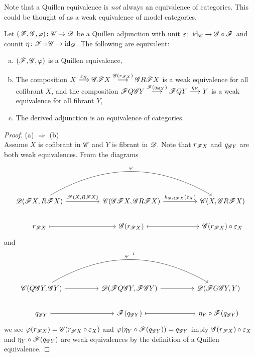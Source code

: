 \documentclass[10pt]{amsart}
\begin{document}
\begin{rmk}
  Note that a Quillen equivalence is {\it not} always an equivalence of categories.
  This could be thought of as a weak equivalence of model categories.
\end{rmk}

\begin{prop}
  Let $(\mathscr{F}, \mathscr{G}, \varphi) \colon \mathscr{C} \to \mathscr{D}$ be a Quillen adjunction with unit $\varepsilon \colon \operatorname{id}_{\mathscr{C}} \to \mathscr{G} \circ \mathscr{F}$ and counit $\eta \colon \mathscr{F} \circ \mathscr{G} \to \operatorname{id}_{\mathscr{D}}$.
  The following are equivalent:
  \begin{enumerate}[(a)]
  \item
    $(\mathscr{F}, \mathscr{G}, \varphi)$ is a Quillen equivalence,
  \item
    The composition 
    $X \overset{\varepsilon_X}\longrightarrow \mathscr{G} \mathscr{F} X \overset{\mathscr{G}(r_{\mathscr{F} X})}\longrightarrow \mathscr{G} R \mathscr{F} X$
    is a weak equivalence for all cofibrant $X$, and the composition
    $\mathscr{F} Q \mathscr{G} Y \overset{\mathscr{F}(q_{\mathscr{G} Y})}\longrightarrow \mathscr{F} Q Y \overset{\eta_Y}\longrightarrow Y$ is a weak equivalence for all fibrant $Y$,
  \item
    The derived adjunction is an equivalence of categories.
  \end{enumerate}

  \begin{proof}
    (a) $\Rightarrow$ (b)\\
    Assume $X$ is cofibrant in $\mathscr{C}$ and $Y$ is fibrant in $\mathscr{D}$.
    Note that $r_{\mathscr{F} X}$ and $q_{\mathscr{G} Y}$ are both weak equivalences.
    From the diagrams
    $$\begin{tikzcd}      
      \D(\F X, R \F X)\arrow{rr}{\F(X, R \F X)}\arrow[bend left]{rrrr}{\varphi} 
      && 
      \C(\G \F X, \G R \F X) \arrow{rr}{h_{\G R \F X}(\varepsilon_X)} && 
      \C(X, \G R \F X)\\
      r_{\F X} \arrow[mapsto]{rr} && \G(r_{\F X}) \arrow[mapsto]{rr} & & \G(r_{\F X}) \circ \varepsilon _X
    \end{tikzcd}$$
    and
    $$\begin{tikzcd}
      \C(Q\G Y, \G Y) \arrow{rr}\arrow[bend left]{rrrr}{\varphi^{-1}} && \D(\F Q \G Y, \F \G Y) \arrow{rr} && \D(\F G \G Y, Y)\\
      q_{\G Y} \arrow[mapsto]{rr} && \F(q_{\G Y}) \arrow[mapsto]{rr} && \eta_{Y} \circ \F(q_{\G Y})
    \end{tikzcd}$$
    we see $\varphi(r_{\mathscr{F} X}) = \mathscr{G}(r_{\mathscr{F} X} \circ \varepsilon_X)$ and $\varphi(\eta_Y \circ \mathscr{F}(q_{\mathscr{G} Y})) = q_{\mathscr{G} Y}$ imply $\mathscr{G}(r_{\mathscr{F} X}) \circ \varepsilon_X$ and $\eta_Y \circ \mathscr{F}(q_{\mathscr{G} Y})$ are weak equivalences by the definition of a Quillen equivalence.
    

\end{proof}
\end{prop}
\end{document}
